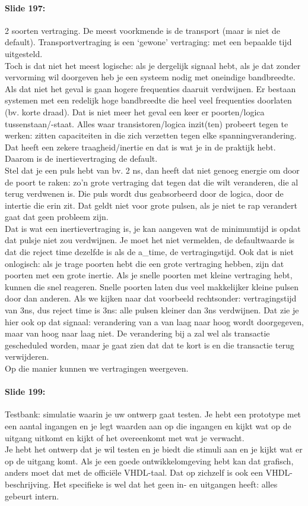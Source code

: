 \documentclass[10pt,a4paper]{book}
\begin{document}
\paragraph{Slide 197:} 2 soorten vertraging. De meest voorkmende is de transport (maar is niet de default). Transportvertraging is een `gewone' vertraging: met een bepaalde tijd uitgesteld.\\
Toch is dat niet het meest logische: als je dergelijk signaal hebt, als je dat zonder vervorming wil doorgeven heb je een systeem nodig met oneindige bandbreedte. Als dat niet het geval is gaan hogere frequenties daaruit verdwijnen. Er bestaan systemen met een redelijk hoge bandbreedte die heel veel frequenties doorlaten (bv. korte draad). Dat is niet meer het geval een keer er poorten/logica tussenstaan/-staat. Alles waar transistoren/logica inzit(ten) probeert tegen te werken: zitten capaciteiten in die zich verzetten tegen elke spanningverandering. Dat heeft een zekere traagheid/inertie en dat is wat je in de praktijk hebt. Daarom is de inertievertraging de default.\\
Stel dat je een puls hebt van bv. 2 ns, dan heeft dat niet genoeg energie om door de poort te raken: zo'n grote vertraging dat tegen dat die wilt veranderen, die al terug verdwenen is. Die puls wordt dus geabsorbeerd door de logica, door de intertie die erin zit. Dat geldt niet voor grote pulsen, als je niet te rap verandert gaat dat geen probleem zijn.\\
Dat is wat een inertievertraging is, je kan aangeven wat de minimumtijd is opdat dat pulsje niet zou verdwijnen. Je moet het niet vermelden, de defaultwaarde is dat die reject time dezelfde is als de a\_time, de vertragingstijd. Ook dat is niet onlogisch: als je trage poorten hebt die een grote vertraging hebben, zijn dat poorten met een grote inertie. Als je snelle poorten met kleine vertraging hebt, kunnen die snel reageren. Snelle poorten laten dus veel makkelijker kleine pulsen door dan anderen. Als we kijken naar dat voorbeeld rechtsonder: vertragingstijd van 3ns, dus reject time is 3ns: alle pulsen kleiner dan 3ns verdwijnen. Dat zie je hier ook op dat signaal: verandering van a van laag naar hoog wordt doorgegeven, maar van hoog naar laag niet. De verandering bij a zal wel als transactie gescheduled worden, maar je gaat zien dat dat te kort is en die transactie terug verwijderen.\\
Op die manier kunnen we vertragingen weergeven.

\paragraph{Slide 199:} Testbank: simulatie waarin je uw ontwerp gaat testen. Je hebt een prototype met een aantal ingangen en je legt waarden aan op die ingangen en kijkt wat op de uitgang uitkomt en kijkt of het overeenkomt met wat je verwacht.\\
Je hebt het ontwerp dat je wil testen en je biedt die stimuli aan en je kijkt wat er op de uitgang komt. Als je een goede ontwikkelomgeving hebt kan dat grafisch, anders moet dat met de offici\"ele VHDL-taal. Dat op zichzelf is ook een VHDL-beschrijving. Het specifieke is wel dat het geen in- en uitgangen heeft: alles gebeurt intern.
\end{document}
